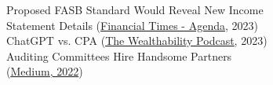 \documentclass[]{deedy-resume-openfont}
\begin{document}
\begin{minipage}[t]{0.49\textwidth}
Proposed FASB Standard Would Reveal New Income \\
\hspace*{.4cm} Statement Details (\href{https://t.e2ma.net/click/qo491h/ejc7cb2/21esdw}{\underline{Financial Times - Agenda}}, 2023) \\
ChatGPT vs. CPA (\href{https://www.youtube.com/watch?v=PMAYckefB_w&t=1488s&pp=ygUMTmljayBIYWxsbWFu}{\underline{The Wealthability Podcast}}, 2023) \\
Auditing Committees Hire Handsome Partners \\ 
\hspace*{.4cm} (\href{https://medium.com/texas-mccombs/auditing-committees-hire-handsome-partners-29d99a33bf}{\underline{Medium}, 2022})


\end{minipage}
\end{document}
